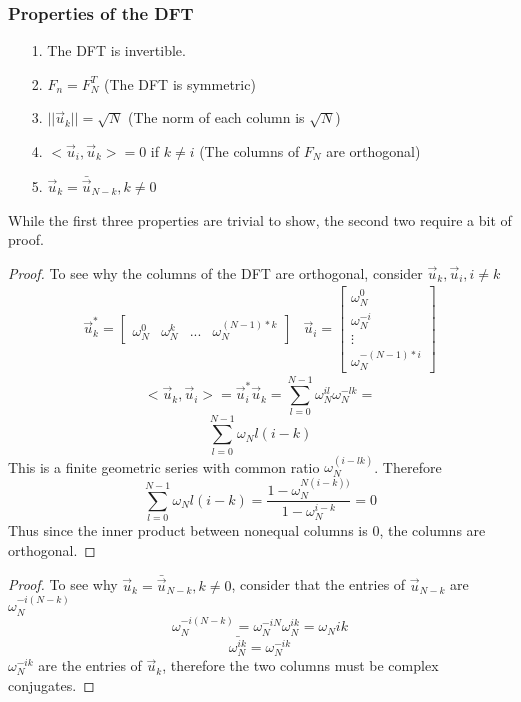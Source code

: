 \documentclass{article}
\newtheorem{proof}{Proof}
\begin{document}
\subsubsection{Properties of the DFT}
\begin{itemize}
    \item[1. ] The DFT is invertible.
    \item[2. ] $F_n = F_N^T$ (The DFT is symmetric)
    \item[3. ] $||\vec{u}_k|| = \sqrt{N}$ (The norm of each column is $\sqrt{N}$)
    \item[4. ] $<\vec{u}_i, \vec{u}_k> = 0$ if $k \ne i$ (The columns of $F_N$ are orthogonal)
    \item[5. ] $\vec{u}_k = \bar{\vec{u}}_{N-k}, k\ne 0$
\end{itemize}
While the first three properties are trivial to show, the second two require a bit of proof.
\begin{proof}
    To see why the columns of the DFT are orthogonal, consider $\vec{u}_k, \vec{u}_i, i\ne k$
    \[
        \begin{array}{cc}
            \vec{u}_k^* = \left[
            \begin{array}{cccc}
                \omega_N^0 & \omega_N^k & ... & \omega_N^{(N-1)*k}
            \end{array}
        \right] & 
        \vec{u}_i = \left[
            \begin{array}{c}
                \omega_N^0\\
                \omega_N^{-i}\\
                \vdots\\
                \omega_N^{-(N-1)*i}
            \end{array}
        \right]
        \end{array}
    \]
    $$<\vec{u}_k, \vec{u}_i> = \vec{u}_i^*\vec{u}_k = \sum_{l=0}^{N-1}{\omega_N^{il}\omega_N^{-lk}} = $$
    $$\sum_{l=0}^{N-1}{\omega_N{l(i-k)}}$$
    This is a finite geometric series with common ratio $\omega_N^(i-lk)$.
    Therefore 
    $$\sum_{l=0}^{N-1}{\omega_N{l(i-k)}} = \frac{1 - \omega_N^{N(i-k))}}{1-\omega_N^{i-k}} = 0$$
    Thus since the inner product between nonequal columns is 0, the columns are orthogonal.
\end{proof}
\begin{proof}
    To see why $\vec{u}_k = \bar{\vec{u}}_{N-k}, k\ne 0$, consider that
    the entries of $\vec{u}_{N-k}$ are $\omega_N^{-i(N-k)}$
    $$\omega_N^{-i(N-k)} = \omega_N^{-iN}\omega_N^{ik}=\omega_N{ik}$$
    $$\bar{\omega_N^{ik}} = \omega_N^{-ik}$$
    $\omega_N^{-ik}$ are the entries of $\vec{u}_k$, therefore the two columns must be complex conjugates.
\end{proof}
\end{document}
